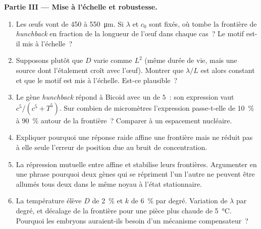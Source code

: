 \begin{problem}
\medskip
\noindent\textbf{Partie III --- Mise à l'échelle et robustesse.}
\begin{enumerate}[resume]
  \item Les œufs vont de \qty{450}{} à \qty{550}{\micro m}. Si $\lambda$
        et $c_{0}$ sont fixés, où tombe la frontière de
        \emph{hunchback} en fraction de la longueur de l'œuf dans chaque
        cas~? Le motif est-il mis à l'échelle~?
  \item Supposons plutôt que $D$ varie comme $L^{2}$ (même durée de vie,
        mais une source dont l'étalement croît avec l'œuf). Montrer que
        $\lambda/L$ est alors constant et que le motif est mis à
        l'échelle. Est-ce plausible~?
  \item Le gène \emph{hunchback} répond à Bicoid avec un  de $5$~: son expression vaut $c^{5}/(c^{5} + T^{5})$. Sur
        combien de micromètres l'expression passe-t-elle de \qty{10}{\%}
        à \qty{90}{\%} autour de la frontière~? Comparer à un espacement
        nucléaire.
  \item Expliquer pourquoi une réponse raide affine une frontière mais
        ne réduit pas à elle seule l'erreur de position due au bruit de
        concentration.
  \item La répression mutuelle entre  affine et stabilise leurs
        frontières. Argumenter en une phrase pourquoi deux gènes qui se
        répriment l'un l'autre ne peuvent être allumés tous deux dans le
        même noyau à l'état stationnaire.
  \item La température élève $D$ de \qty{2}{\%} et $k$ de \qty{6}{\%}
        par degré. Variation de $\lambda$ par degré, et décalage de la
        frontière pour une pièce plus chaude de \qty{5}{\celsius}.
        Pourquoi les embryons auraient-ils besoin d'un mécanisme
        compensateur~?
\end{enumerate}


\end{problem}
